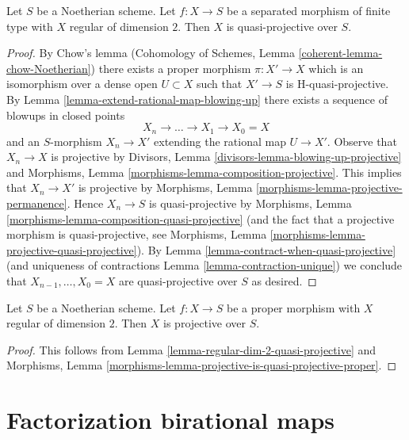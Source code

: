 \begin{lemma}
\label{lemma-regular-dim-2-quasi-projective}
Let $S$ be a Noetherian scheme. Let $f : X \to S$ be a
separated morphism of finite type with $X$ regular of dimension $2$.
Then $X$ is quasi-projective over $S$.
\end{lemma}

\begin{proof}
By Chow's lemma
(Cohomology of Schemes, Lemma \ref{coherent-lemma-chow-Noetherian})
there exists a proper morphism $\pi : X' \to X$ which is an isomorphism
over a dense open $U \subset X$ such that $X' \to S$ is H-quasi-projective.
By Lemma \ref{lemma-extend-rational-map-blowing-up}
there exists a sequence of blowups in closed points
$$
X_n \to \ldots \to X_1 \to X_0 = X
$$
and an $S$-morphism $X_n \to X'$ extending the rational map $U \to X'$.
Observe that $X_n \to X$ is projective by
Divisors, Lemma \ref{divisors-lemma-blowing-up-projective} and
Morphisms, Lemma \ref{morphisms-lemma-composition-projective}.
This implies that $X_n \to X'$ is projective by
Morphisms, Lemma \ref{morphisms-lemma-projective-permanence}.
Hence $X_n \to S$ is quasi-projective by
Morphisms, Lemma \ref{morphisms-lemma-composition-quasi-projective}
(and the fact that a projective morphism is quasi-projective, see
Morphisms, Lemma \ref{morphisms-lemma-projective-quasi-projective}).
By Lemma \ref{lemma-contract-when-quasi-projective}
(and uniqueness of contractions Lemma \ref{lemma-contraction-unique})
we conclude  that $X_{n - 1}, \ldots, X_0 = X$ are quasi-projective over $S$
as desired.
\end{proof}

\begin{lemma}
\label{lemma-regular-dim-2-projective}
Let $S$ be a Noetherian scheme. Let $f : X \to S$ be a
proper morphism with $X$ regular of dimension $2$.
Then $X$ is projective over $S$.
\end{lemma}

\begin{proof}
This follows from
Lemma \ref{lemma-regular-dim-2-quasi-projective} and
Morphisms, Lemma \ref{morphisms-lemma-projective-is-quasi-projective-proper}.
\end{proof}






\section{Factorization birational maps}
\label{section-factorizing}

